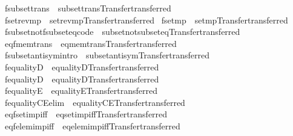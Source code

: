\begin{isabellebody}
\isamarkupfalse%
\ fsubset{\isacharunderscore}trans\ {\isacharequal}\ subset{\isacharunderscore}trans{\isacharbrackleft}Transfer{\isachardot}transferred{\isacharbrackright}\isanewline
{}\isamarkupfalse%
\ fset{\isacharunderscore}rev{\isacharunderscore}mp\ {\isacharequal}\ set{\isacharunderscore}rev{\isacharunderscore}mp{\isacharbrackleft}Transfer{\isachardot}transferred{\isacharbrackright}\isanewline
{}\isamarkupfalse%
\ fset{\isacharunderscore}mp\ {\isacharequal}\ set{\isacharunderscore}mp{\isacharbrackleft}Transfer{\isachardot}transferred{\isacharbrackright}\isanewline
{}\isamarkupfalse%
\ fsubset{\isacharunderscore}not{\isacharunderscore}fsubset{\isacharunderscore}eq{\isacharbrackleft}code{\isacharbrackright}\ {\isacharequal}\ subset{\isacharunderscore}not{\isacharunderscore}subset{\isacharunderscore}eq{\isacharbrackleft}Transfer{\isachardot}transferred{\isacharbrackright}\isanewline
{}\isamarkupfalse%
\ eq{\isacharunderscore}fmem{\isacharunderscore}trans\ {\isacharequal}\ eq{\isacharunderscore}mem{\isacharunderscore}trans{\isacharbrackleft}Transfer{\isachardot}transferred{\isacharbrackright}\isanewline
{}\isamarkupfalse%
\ fsubset{\isacharunderscore}antisym{\isacharbrackleft}intro{\isacharbang}{\isacharbrackright}\ {\isacharequal}\ subset{\isacharunderscore}antisym{\isacharbrackleft}Transfer{\isachardot}transferred{\isacharbrackright}\isanewline
{}\isamarkupfalse%
\ fequalityD{}\ {\isacharequal}\ equalityD{}{\isacharbrackleft}Transfer{\isachardot}transferred{\isacharbrackright}\isanewline
{}\isamarkupfalse%
\ fequalityD{}\ {\isacharequal}\ equalityD{}{\isacharbrackleft}Transfer{\isachardot}transferred{\isacharbrackright}\isanewline
{}\isamarkupfalse%
\ fequalityE\ {\isacharequal}\ equalityE{\isacharbrackleft}Transfer{\isachardot}transferred{\isacharbrackright}\isanewline
{}\isamarkupfalse%
\ fequalityCE{\isacharbrackleft}elim{\isacharbrackright}\ {\isacharequal}\ equalityCE{\isacharbrackleft}Transfer{\isachardot}transferred{\isacharbrackright}\isanewline
{}\isamarkupfalse%
\ eqfset{\isacharunderscore}imp{\isacharunderscore}iff\ {\isacharequal}\ eqset{\isacharunderscore}imp{\isacharunderscore}iff{\isacharbrackleft}Transfer{\isachardot}transferred{\isacharbrackright}\isanewline
{}\isamarkupfalse%
\ eqfelem{\isacharunderscore}imp{\isacharunderscore}iff\ {\isacharequal}\ eqelem{\isacharunderscore}imp{\isacharunderscore}iff{\isacharbrackleft}Transfer{\isachardot}transferred{\isacharbrackright}\isanewline

\end{isabellebody}
